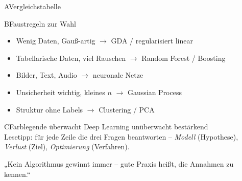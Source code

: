 \begin{hngrid}
\begin{hnp}[raster multicolumn=6,acc=hnnavy]{A}{Vergleichstabelle}
\end{hnp}
%
\begin{hnp}[raster multicolumn=3,acc=hnpurple]{B}{Faustregeln zur Wahl}
\begin{itemize}
\item Wenig Daten, Gauß-artig $\to$ GDA / regularisiert linear
\item Tabellarische Daten, viel Rauschen $\to$ Random Forest / Boosting
\item Bilder, Text, Audio $\to$ neuronale Netze
\item Unsicherheit wichtig, kleines $n$ $\to$ Gaussian Process
\item Struktur ohne Labels $\to$ Clustering / PCA
\end{itemize}
\end{hnp}
%
\begin{hnp}[raster multicolumn=3,acc=hngreen]{C}{Farblegende}
\colorbox{hnorange!10}{überwacht} \colorbox{hnpurple!10}{Deep Learning} \colorbox{hnteal!10}{unüberwacht} \colorbox{hnrose!10}{bestärkend}\\[2pt]
Lesetipp: für jede Zeile die drei Fragen beantworten -- \emph{Modell} (Hypothese), \emph{Verlust} (Ziel), \emph{Optimierung} (Verfahren).
\end{hnp}
%
\begin{hnbanner}[raster multicolumn=6]
„Kein Algorithmus gewinnt immer -- gute Praxis heißt, die Annahmen zu kennen.“
\end{hnbanner}
\end{hngrid}
